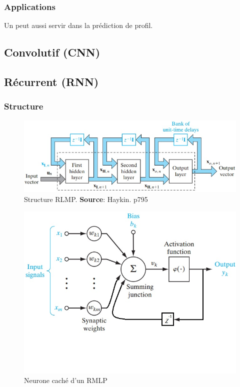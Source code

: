 \documentclass[12pt,a4paper,oneside, titlepage]{article}
\begin{document}
\subsubsection*{Applications}
Un \rbf peut aussi servir dans la prédiction de profil.\cite{statistica}

\subsection{Convolutif (CNN)}
\subsection{Récurrent (RNN)}
\subsubsection*{Structure}
\begin{figure}
 \centering
 \includegraphics[scale=0.5]{../figures/structurermlp.jpg}
 \caption{Structure RLMP. \textbf{Source}: Haykin. p795\cite{Haykin}}
 \label{structurermlp}
\end{figure}
\begin{figure}
 \centering
 \includegraphics[scale=0.5]{../figures/neuronermlp.jpg}
 \caption{Neurone caché d'un RMLP}
 \label{neuronermlp}
\end{figure}
\end{document}
